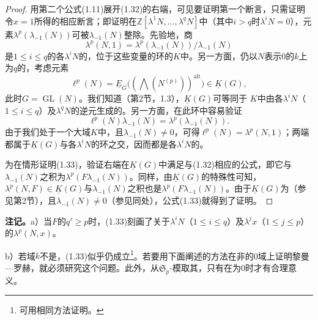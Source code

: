 \begin{proof}
用第二个公式(1.11)展开(1.32)的右端，可见要证明第一个断言，只需证明令$x=1$所得的相应断言；即证明在$\mathbb Z[\lambda^1N,\ldots,\lambda^qN]$中（其中$i>q$时$\lambda^iN=0$），元素$\lambda^p(\lambda_{-1}(N))$可被$\lambda_{-1}(N)$整除。先验地，商
\[\lambda^p(N,1)=\lambda^p(\lambda_{-1}(N))/\lambda_{-1}(N)\]
是$1\leq i\leq q$的各$\lambda^iN$的，位于这些变量的环的$K$中。另一方面，仍以$N$表示0的$k$上为$q$的，考虑元素
\[\ell^p(N)=\underline E_G\bigl((\bigwedge(N^{(p)}))^{\mathrm{alt}}\bigr)\in\underline K(G),\]
此时$G=\operatorname{GL}(N)$。我们知道（第2节，1.3），$\underline K(G)$可等同于
$K$中由各$\lambda^iN$（$1\leq i\leq q$）及$\lambda^qN$的逆元生成的。另一方面，在此环中容易验证
\[\ell^p(N)\lambda_{-1}(N)=\lambda^p(\lambda_{-1}(N)).\]
由于我们处于一个大域$K$中，且$\lambda_{-1}(N)\ne0$，可得$\ell^p(N)=\lambda^p(N,1)$；两端都属于$\underline K(G)$与各$\lambda^iN$的环之交，因而都是各$\lambda^iN$的。

为在情形证明(1.33)，验证右端在$\underline K(G)$中满足与(1.32)相应的公式，即它与$\lambda_{-1}(N)$之积为$\lambda^p(F\lambda_{-1}(N))$。同样，由$\underline K(G)$的特殊性可知，$\lambda^p(N,F)\in\underline K(G)$与$\lambda_{-1}(N)$之积也是$\lambda^p(F\lambda_{-1}(N))$。由于$\underline K(G)$为（参见第2节），且$\lambda_{-1}(N)\ne0$（参见同处），公式(1.33)就得到了证明。
\end{proof}
\textbf{注记。}a）当$F$的$q'\geq p$时，(1.33)刻画了关于$\lambda^iN$（$1\leq i\leq q$）及$\lambda^jx$（$1\leq j\leq p$）的$\lambda^p(N,x)$。

b）若域$k$不是，(1.33)似乎仍成立\footnote{可用相同方法证明。}。若要用下面阐述的方法在非的0域上证明黎曼—罗赫，就必须研究这个问题。此外，从$\mathfrak S_p$-模取其，只有在为0时才有合理意义。


